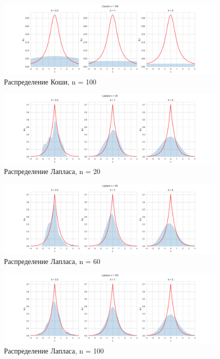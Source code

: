 \documentclass[../main.tex]{subfiles}
\begin{document}
    \begin{figure}[H]
        \centering
        \includegraphics[scale=0.5]{figures/CauchyNuclear100.png}
        \caption{Распределение Коши, n = 100}
        \label{fig:normal}
    \end{figure}
    
    \begin{figure}[H]
        \centering
        \includegraphics[scale=0.5]{figures/LaplaceNuclear20.png}
        \caption{Распределение Лапласа, n = 20}
        \label{fig:normal}
    \end{figure}
    
    \begin{figure}[H]
        \centering
        \includegraphics[scale=0.5]{figures/LaplaceNuclear60.png}
        \caption{Распределение Лапласа, n = 60}
        \label{fig:normal}
    \end{figure}
    
    \begin{figure}[H]
        \centering
        \includegraphics[scale=0.5]{figures/LaplaceNuclear100.png}
        \caption{Распределение Лапласа, n = 100}
        \label{fig:normal}
    \end{figure}
    
\end{document}
